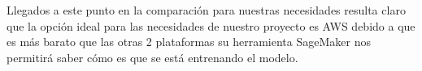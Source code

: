 \documentclass[12pt, a4paper, titlepage]{report}
\begin{document}
		Llegados a este punto en la comparación para nuestras necesidades resulta claro que la opción ideal para las necesidades de nuestro proyecto es AWS debido a que es más barato que las otras 2 plataformas su herramienta SageMaker nos permitirá saber cómo es que se está entrenando el modelo.
		
		

\end{document}
